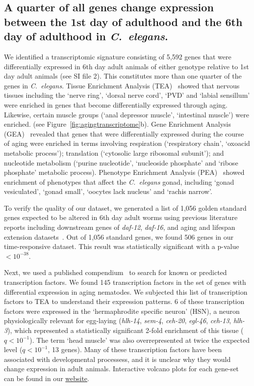 \documentclass[10pt,letterpaper,twocolumn]{article}
\newcommand{\cel}{\emph{C.~elegans}}
\newcommand{\gene}[1]{\emph{\mbox{#1}}}
\newcommand{\agen}{5,592}
\newcommand{\tfaging}{145}
\newcommand{\goldn}{1,056}
\newcommand{\goldfound}{506}
\newcommand{\goldpval}{$<10^{-38}$}
\newcommand{\webref}{
\href{https://wormlabcaltech.github.io/Angeles_Leighton_2016/}{website}}
\begin{document}
\subsection*{A quarter of all genes change expression between the 1st day of
             adulthood and the 6th day of adulthood in \cel{}.}
We identified a transcriptomic signature consisting of \agen{} genes that were
differentially expressed in 6th day adult animals of either genotype relative
to 1st day adult animals (see SI file 2). This constitutes more than one quarter
of the genes in \cel{}. Tissue Enrichment Analysis (TEA)~\cite{Angeles-Albores2016}
showed that nervous tissues including the `nerve ring', `dorsal nerve cord', `PVD'
and `labial sensillum' were enriched in genes that become differentially expressed
through aging. Likewise, certain muscle groups (`anal depressor muscle', `intestinal
muscle') were enriched. (see Figure~\ref{fig:agingtranscriptome}b). Gene
Enrichment Analysis (GEA)~\cite{Angeles-Albores106369} revealed that genes that
were differentially expressed during the course of aging were enriched in terms
involving respiration (`respiratory chain', `oxoacid metabolic process');
translation (`cytosolic large ribosomal subunit'); and nucleotide metabolism
(`purine nucleotide', `nucleoside phosphate' and `ribose phosphate' metabolic
process). Phenotype Enrichment Analysis (PEA)~\cite{Angeles-Albores106369} showed
enrichment of phenotypes that affect the \cel{} gonad, including `gonad vesiculated',
`gonad small', `oocytes lack nucleus' and `rachis narrow'.

To verify the quality of our dataset, we generated a list of \goldn{} golden
standard genes expected to be altered in 6th day adult worms using previous
literature reports including downstream genes of \gene{daf-12}, \gene{daf-16},
and aging and lifespan extension datasets~\cite{Murphy2003,Halaschek-wiener2005,
Lund2002,McCormick2012,Eckley2013}. Out of \goldn{} standard genes, we found
\goldfound{} genes in our time-responsive dataset. This result was statistically
significant with a p-value \goldpval{}.

Next, we used a published compendium~\cite{Reece-Hoyes2005} to search for known
or predicted transcription factors. We found \tfaging{} transcription factors in
the set of genes with differential expression in aging nematodes. We subjected
this list of transcription factors to TEA to understand their expression
patterns. 6 of these
transcription factors were expressed in the `hermaphrodite specific neuron'
(HSN), a neuron physiologically relevant for egg-laying (\gene{hlh-14}, \gene{sem-4},
\gene{ceh-20}, \gene{egl-46}, \gene{ceh-13}, \gene{hlh-3}), which represented
a statistically significant 2-fold enrichment of this tissue ($q<10^{-1}$).
The term `head muscle' was also overrepresented at twice the expected level
($q<10^{-1}$, 13 genes). Many of these transcription factors
have been  associated with developmental processess, and it is unclear why they
would change expression in adult animals. Interactive volcano plots for each
gene-set can be found in our \webref{}.
\end{document}
